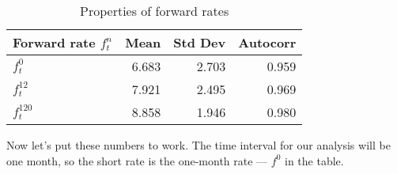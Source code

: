 \documentclass[11pt]{article}
\begin{document}
%
\begin{table}[h]
\centering
\caption{Properties of forward rates}
\begin{tabular}{lrrr}
\toprule
Forward rate $f^n_t$    &  Mean  &  Std Dev  &  Autocorr \\
\midrule
$f^0_t$                 &  6.683 & 2.703     &  0.959   \\
$f^{12}_t$              &  7.921 & 2.495     &  0.969   \\
$f^{120}_t$             &  8.858 & 1.946     &  0.980   \\
\bottomrule
\end{tabular}
\label{tab:forward-moments}
\end{table}
%

Now let's put these numbers to work.
The time interval for our analysis will be one month,
so the short rate is the one-month rate --- $f^0$ in the table.
%
\end{document}
